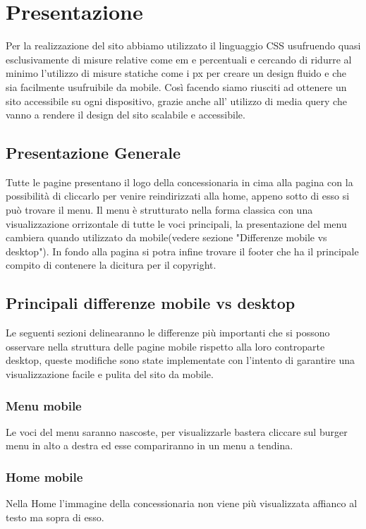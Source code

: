 \section{Presentazione}
    Per la realizzazione del sito abbiamo utilizzato il linguaggio CSS usufruendo quasi esclusivamente di misure relative come em e percentuali e cercando di ridurre al minimo l'utilizzo di misure statiche come i px per creare un design fluido e che sia facilmente usufruibile da mobile.
    Così facendo siamo riusciti ad ottenere un sito accessibile su ogni dispositivo, grazie anche all' utilizzo di media query che vanno a rendere il design del sito scalabile e accessibile.
    
    \subsection{Presentazione Generale}
    Tutte le pagine presentano il logo della concessionaria in cima alla pagina con la possibilità di cliccarlo per venire reindirizzati alla home, appeno sotto di esso si può trovare il menu. Il menu è strutturato nella forma classica con una visualizzazione orrizontale di tutte le voci principali, la presentazione del menu cambiera quando utilizzato da mobile(vedere sezione "Differenze mobile vs desktop"). In fondo alla pagina si potra infine trovare il footer che ha il principale compito di contenere la dicitura per il copyright.

    \subsection{Principali differenze mobile vs desktop}
    Le seguenti sezioni delinearanno le differenze più importanti che si possono osservare nella struttura delle pagine mobile rispetto alla loro controparte desktop, queste modifiche sono state implementate con l'intento di garantire una visualizzazione facile e pulita del sito da mobile.

        \subsubsection{Menu mobile}
        Le voci del menu saranno nascoste, per visualizzarle bastera cliccare sul burger menu in alto a destra ed esse compariranno in un menu a tendina.

        \subsubsection{Home mobile}
        Nella Home l'immagine della concessionaria non viene più visualizzata affianco al testo ma sopra di esso.

